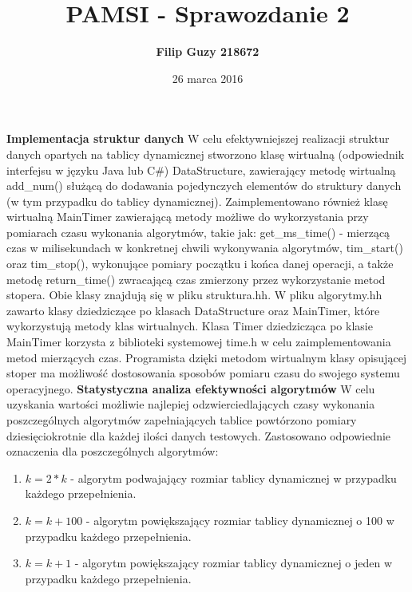 \documentclass[10pt, a4paper]{article}
\date{26 marca 2016}
\title{\textbf{PAMSI - Sprawozdanie 2}}
\author{\textbf{Filip Guzy 218672}}
\begin{document}
\maketitle

\begin{flushleft}
\textbf{Implementacja struktur danych} \newline \newline
W celu efektywniejszej realizacji struktur danych opartych na tablicy dynamicznej stworzono klasę wirtualną (odpowiednik interfejsu w języku Java lub C\#) DataStructure, zawierający metodę wirtualną add\_num() służącą do dodawania pojedynczych elementów do struktury danych (w tym przypadku do tablicy dynamicznej). Zaimplementowano również klasę wirtualną MainTimer zawierającą metody możliwe do wykorzystania przy pomiarach czasu wykonania algorytmów, takie jak: get\_ms\_time() - mierzącą czas w milisekundach w konkretnej chwili wykonywania algorytmów, tim\_start() oraz tim\_stop(), wykonujące pomiary początku i końca danej operacji, a także metodę return\_time() zwracającą czas zmierzony przez wykorzystanie metod stopera. Obie klasy znajdują się w pliku struktura.hh. W pliku algorytmy.hh zawarto klasy dziedziczące po klasach DataStructure oraz MainTimer, które wykorzystują metody klas wirtualnych. Klasa Timer dziedzicząca po klasie MainTimer korzysta z biblioteki systemowej time.h w celu zaimplementowania metod mierzących czas. Programista dzięki metodom wirtualnym klasy opisującej stoper ma możliwość dostosowania sposobów pomiaru czasu do swojego systemu operacyjnego. \newline \newline
\textbf{Statystyczna analiza efektywności algorytmów} \newline \newline
W celu uzyskania wartości możliwie najlepiej odzwierciedlających czasy wykonania poszczególnych algorytmów zapełniających tablice powtórzono pomiary dziesięciokrotnie dla każdej ilości danych testowych. Zastosowano odpowiednie oznaczenia dla poszczególnych algorytmów:

\begin{enumerate}
\item $k=2*k$ - algorytm podwajający rozmiar tablicy dynamicznej w przypadku każdego przepełnienia.
\item $k=k+100$ - algorytm powiększający rozmiar tablicy dynamicznej o 100 w przypadku każdego przepełnienia.
\item $k=k+1$ - algorytm powiększający rozmiar tablicy dynamicznej o jeden w przypadku każdego przepełnienia.
\end{enumerate}


\end{flushleft}
\end{document}
